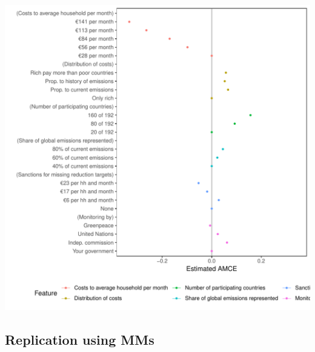 \documentclass[a4paper,12pt]{article}\usepackage[]{graphicx}\usepackage[]{color}
\makeatletter
\def\maxwidth{ %
  \ifdim\Gin@nat@width>\linewidth
    \linewidth
  \else
    \Gin@nat@width
  \fi
}
\newenvironment{knitrout}{}{} %
\makeatother
\begin{document}
\begin{knitrout}
\color{fgcolor}
\includegraphics[width=\maxwidth]{figure/bechtel_amce-1} 

\end{knitrout}

\clearpage



\clearpage

\subsection{Replication using MMs}
\end{document}
